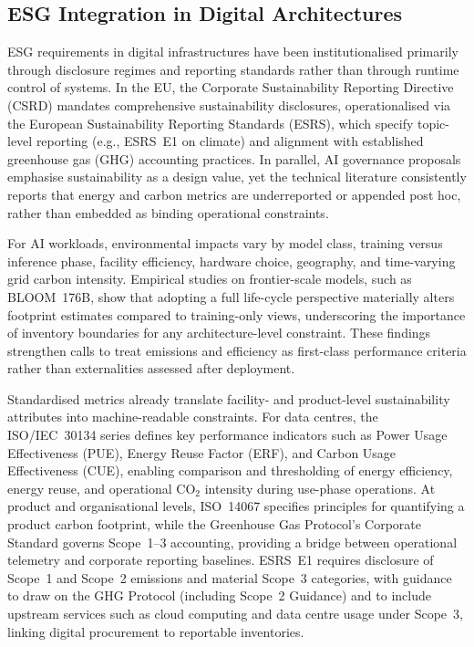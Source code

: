 \documentclass[oneside,10pt]{swissi}
\begin{document}
\subsection{ESG Integration in Digital Architectures}\label{subsec:esg-integration}

ESG requirements in digital infrastructures have been institutionalised primarily through disclosure regimes and reporting standards rather than through runtime control of systems. In the EU, the Corporate Sustainability Reporting Directive (CSRD) mandates comprehensive sustainability disclosures, operationalised via the European Sustainability Reporting Standards (ESRS), which specify topic-level reporting (e.g., ESRS~E1 on climate) and alignment with established greenhouse gas (GHG) accounting practices.\cite{csrd_2022,esrs_2023_2772,esrs_e1_2023} In parallel, AI governance proposals emphasise sustainability as a design value, yet the technical literature consistently reports that energy and carbon metrics are underreported or appended post hoc, rather than embedded as binding operational constraints.\cite{schwartz2020greenai,strubell2019energy,henderson2020reporting}

For AI workloads, environmental impacts vary by model class, training versus inference phase, facility efficiency, hardware choice, geography, and time-varying grid carbon intensity.\cite{patterson2021carbon,dodge2022carbonintensity} Empirical studies on frontier-scale models, such as BLOOM~176B, show that adopting a full life-cycle perspective materially alters footprint estimates compared to training-only views, underscoring the importance of inventory boundaries for any architecture-level constraint.\cite{luccioni2023bloom} These findings strengthen calls to treat emissions and efficiency as first-class performance criteria rather than externalities assessed after deployment.\cite{schwartz2020greenai}

Standardised metrics already translate facility- and product-level sustainability attributes into machine-readable constraints. For data centres, the ISO/IEC~30134 series defines key performance indicators such as Power Usage Effectiveness (PUE), Energy Reuse Factor (ERF), and Carbon Usage Effectiveness (CUE), enabling comparison and thresholding of energy efficiency, energy reuse, and operational \(\mathrm{CO_2}\) intensity during use-phase operations.\cite{iso30134_2_2016,iso30134_6_2021,iso30134_8_2022} At product and organisational levels, ISO~14067 specifies principles for quantifying a product carbon footprint, while the Greenhouse Gas Protocol’s Corporate Standard governs Scope~1–3 accounting, providing a bridge between operational telemetry and corporate reporting baselines.\cite{iso14067_2018,ghgprotocol_corporate_standard_2015} ESRS~E1 requires disclosure of Scope~1 and Scope~2 emissions and material Scope~3 categories, with guidance to draw on the GHG Protocol (including Scope~2 Guidance) and to include upstream services such as cloud computing and data centre usage under Scope~3, linking digital procurement to reportable inventories.\cite{esrs_e1_2023}
\end{document}
